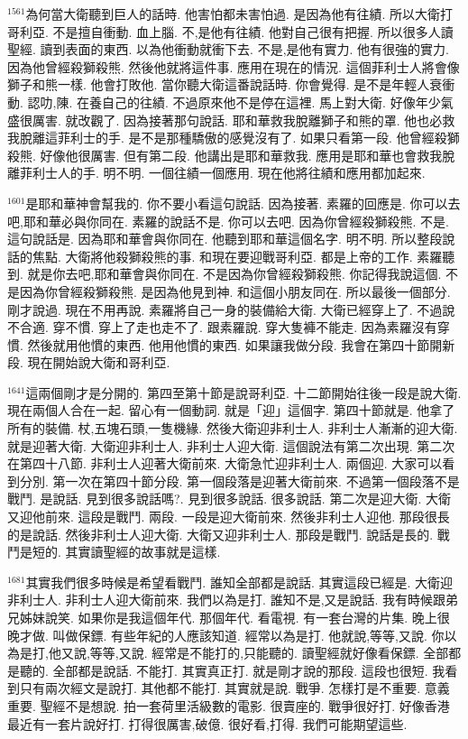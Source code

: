\documentclass{book}
\begin{document}
$^{1561}$為何當大衛聽到巨人的話時.
他害怕都未害怕過.
是因為他有往績.
所以大衛打哥利亞.
不是擅自衝動.
血上腦.
不,是他有往績.
他對自己很有把握.
所以很多人讀聖經.
讀到表面的東西.
以為他衝動就衝下去.
不是,是他有實力.
他有很強的實力.
因為他曾經殺獅殺熊.
然後他就將這件事.
應用在現在的情況.
這個菲利士人將會像獅子和熊一樣.
他會打敗他.
當你聽大衛這番說話時.
你會覺得.
是不是年輕人衰衝動.
認叻,陳.
在養自己的往績.
不過原來他不是停在這裡.
馬上對大衛.
好像年少氣盛很厲害.
就改觀了.
因為接著那句說話.
耶和華救我脫離獅子和熊的罩.
他也必救我脫離這菲利士的手.
是不是那種驕傲的感覺沒有了.
如果只看第一段.
他曾經殺獅殺熊.
好像他很厲害.
但有第二段.
他講出是耶和華救我.
應用是耶和華也會救我脫離菲利士人的手.
明不明.
一個往績一個應用.
現在他將往績和應用都加起來.

$^{1601}$是耶和華神會幫我的.
你不要小看這句說話.
因為接著.
素羅的回應是.
你可以去吧,耶和華必與你同在.
素羅的說話不是.
你可以去吧.
因為你曾經殺獅殺熊.
不是.
這句說話是.
因為耶和華會與你同在.
他聽到耶和華這個名字.
明不明.
所以整段說話的焦點.
大衛將他殺獅殺熊的事.
和現在要迎戰哥利亞.
都是上帝的工作.
素羅聽到.
就是你去吧,耶和華會與你同在.
不是因為你曾經殺獅殺熊.
你記得我說這個.
不是因為你曾經殺獅殺熊.
是因為他見到神.
和這個小朋友同在.
所以最後一個部分.
剛才說過.
現在不用再說.
素羅將自己一身的裝備給大衛.
大衛已經穿上了.
不過說不合適.
穿不慣.
穿上了走也走不了.
跟素羅說.
穿大隻褲不能走.
因為素羅沒有穿慣.
然後就用他慣的東西.
他用他慣的東西.
如果讓我做分段.
我會在第四十節開新段.
現在開始說大衛和哥利亞.

$^{1641}$這兩個剛才是分開的.
第四至第十節是說哥利亞.
十二節開始往後一段是說大衛.
現在兩個人合在一起.
留心有一個動詞.
就是「迎」這個字.
第四十節就是.
他拿了所有的裝備.
杖,五塊石頭,一隻機緣.
然後大衛迎非利士人.
非利士人漸漸的迎大衛.
就是迎著大衛.
大衛迎非利士人.
非利士人迎大衛.
這個說法有第二次出現.
第二次在第四十八節.
非利士人迎著大衛前來.
大衛急忙迎非利士人.
兩個迎.
大家可以看到分別.
第一次在第四十節分段.
第一個段落是迎著大衛前來.
不過第一個段落不是戰鬥.
是說話.
見到很多說話嗎?.
見到很多說話.
很多說話.
第二次是迎大衛.
大衛又迎他前來.
這段是戰鬥.
兩段.
一段是迎大衛前來.
然後非利士人迎他.
那段很長的是說話.
然後非利士人迎大衛.
大衛又迎非利士人.
那段是戰鬥.
說話是長的.
戰鬥是短的.
其實讀聖經的故事就是這樣.

$^{1681}$其實我們很多時候是希望看戰鬥.
誰知全部都是說話.
其實這段已經是.
大衛迎非利士人.
非利士人迎大衛前來.
我們以為是打.
誰知不是,又是說話.
我有時候跟弟兄姊妹說笑.
如果你是我這個年代.
那個年代.
看電視.
有一套台灣的片集.
晚上很晚才做.
叫做保鏢.
有些年紀的人應該知道.
經常以為是打.
他就說,等等,又說.
你以為是打,他又說,等等,又說.
經常是不能打的,只能聽的.
讀聖經就好像看保鏢.
全部都是聽的.
全部都是說話.
不能打.
其實真正打.
就是剛才說的那段.
這段也很短.
我看到只有兩次經文是說打.
其他都不能打.
其實就是說.
戰爭.
怎樣打是不重要.
意義重要.
聖經不是想說.
拍一套荷里活級數的電影.
很賣座的.
戰爭很好打.
好像香港最近有一套片說好打.
打得很厲害,破億.
很好看,打得.
我們可能期望這些.
\end{document}
